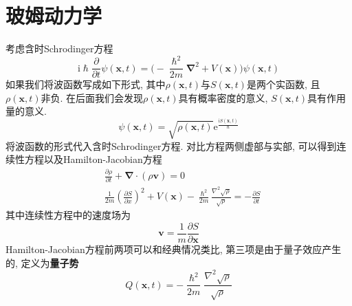     \section{玻姆动力学}

        考虑含时Schrodinger方程
        \begin{equation}
            \mathrm{i}\hslash \frac {\partial}{\partial t} \psi(\bm{x},t) = \bigg( - \frac {\hslash^2}{2m}\bm{\nabla}^2 + V(\bm{x})\bigg) \psi(\bm{x},t)
        \end{equation}
        如果我们将波函数写成如下形式, 其中$\rho(\bm{x},t)$与$S(\bm{x},t)$是两个实函数, 且$\rho(\bm{x},t)$非负. 在后面我们会发现$\rho(\bm{x},t)$具有概率密度的意义, $S(\bm{x},t)$具有作用量的意义. 
        \begin{equation}
            \psi(\bm{x},t) = \sqrt{\rho(\bm{x},t)} \mathrm{e}^{\frac {\mathrm{i}S(\bm{x},t)}{\hslash}}
        \end{equation}
        将波函数的形式代入含时Schrodinger方程. 对比方程两侧虚部与实部, 可以得到连续性方程以及Hamilton-Jacobian方程
        \begin{equation}\begin{aligned}
            &\frac {\partial \rho}{\partial t} + \bm{\nabla} \cdot (\rho \bm{v}) = 0 \\
            &\frac {1}{2m} \left(\frac {\partial S}{\partial x} \right)^2 + V(\bm{x}) - \frac {\hslash^2}{2m} \frac {\nabla^2 \sqrt{\rho}}{\sqrt{\rho}} = -\frac {\partial S}{\partial t}
        \end{aligned}\end{equation}
        其中连续性方程中的速度场为
        \begin{equation}
            \bm{v} = \frac 1m \frac {\partial S}{\partial \bm{x}}
        \end{equation}
        Hamilton-Jacobian方程前两项可以和经典情况类比, 第三项是由于量子效应产生的, 定义为\textbf{量子势}
        \begin{equation}
            Q(\bm{x},t) = - \frac {\hslash^2}{2m} \frac {\nabla^2 \sqrt{\rho}}{\sqrt{\rho}}
        \end{equation}

